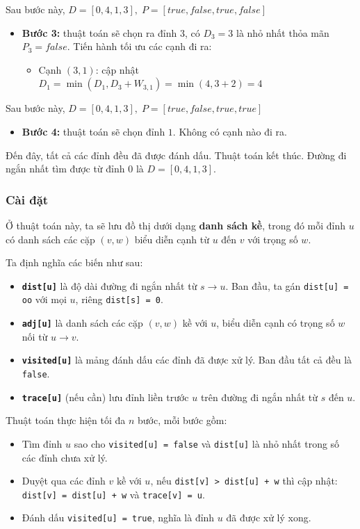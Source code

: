 \documentclass{article}
\begin{document}
Sau bước này, $D = [0, 4, 1, 3],\; P = [true, false, true, false]$

\begin{itemize}
    \item \textbf{Bước 3:} thuật toán sẽ chọn ra đỉnh $3$, có $D_3 = 3$ là nhỏ nhất thỏa mãn $P_3 = false$. Tiến hành tối ưu các cạnh đi ra:
    \begin{itemize}
        \item Cạnh $(3,1)$: cập nhật $D_1 = \min(D_1, D_3 + W_{3,1}) = \min(4, 3 + 2) = 4$
    \end{itemize}
\end{itemize}

Sau bước này, $D = [0, 4, 1, 3],\; P = [true, false, true, true]$

\begin{itemize}
    \item \textbf{Bước 4:} thuật toán sẽ chọn đỉnh $1$. Không có cạnh nào đi ra.
\end{itemize}

Đến đây, tất cả các đỉnh đều đã được đánh dấu. Thuật toán kết thúc. Đường đi ngắn nhất tìm được từ đỉnh $0$ là $D = [0, 4, 1, 3]$.

\subsubsection*{Cài đặt}

Ở thuật toán này, ta sẽ lưu đồ thị dưới dạng \textbf{danh sách kề}, trong đó mỗi đỉnh $u$ có danh sách các cặp $(v, w)$ biểu diễn cạnh từ $u$ đến $v$ với trọng số $w$.

Ta định nghĩa các biến như sau:
\begin{itemize}
    \item \textbf{\texttt{dist[u]}} là độ dài đường đi ngắn nhất từ $s \to u$. Ban đầu, ta gán \texttt{dist[u] = oo} với mọi $u$, riêng \texttt{dist[s] = 0}.
    \item \textbf{\texttt{adj[u]}} là danh sách các cặp $(v, w)$ kề với $u$, biểu diễn cạnh có trọng số $w$ nối từ $u \to v$.
    \item \textbf{\texttt{visited[u]}} là mảng đánh dấu các đỉnh đã được xử lý. Ban đầu tất cả đều là \texttt{false}.
    \item \textbf{\texttt{trace[u]}} (nếu cần) lưu đỉnh liền trước $u$ trên đường đi ngắn nhất từ $s$ đến $u$.
\end{itemize}

Thuật toán thực hiện tối đa $n$ bước, mỗi bước gồm:
\begin{itemize}
    \item Tìm đỉnh $u$ sao cho \texttt{visited[u] = false} và \texttt{dist[u]} là nhỏ nhất trong số các đỉnh chưa xử lý.
    \item Duyệt qua các đỉnh $v$ kề với $u$, nếu \texttt{dist[v] > dist[u] + w} thì cập nhật: \\
    \texttt{dist[v] = dist[u] + w} và \texttt{trace[v] = u}.
    \item Đánh dấu \texttt{visited[u] = true}, nghĩa là đỉnh $u$ đã được xử lý xong.
\end{itemize}
\end{document}
